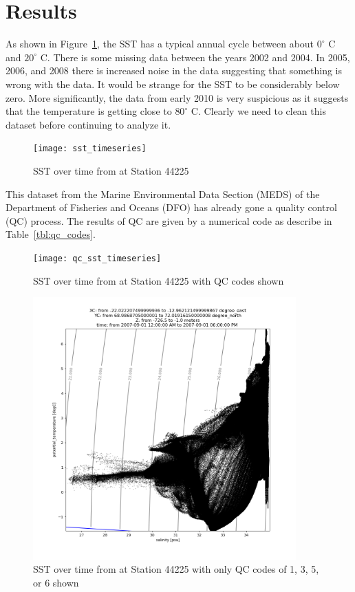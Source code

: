 \documentclass[12pt, letterpaper]{article}
\begin{document}
\section{Results}

As shown in Figure~\ref{fig:sst_timeseries}, the SST has a typical annual cycle between about $0^\circ$ C and $20^\circ$ C. There is some missing data between the years 2002 and 2004.  In 2005, 2006, and 2008 there is
increased noise in the data suggesting that something is wrong with the data.  It would be strange for the SST to be considerably below zero.  More significantly, the data from early 2010 is very suspicious as it suggests that the temperature is getting close to $80^\circ$ C.  Clearly we need to clean this dataset before continuing to analyze it.

\begin{figure}
\texttt{[image: sst\_timeseries]}
\caption{SST over time from at Station 44225}
\label{fig:sst_timeseries}
\end{figure}

This dataset from the Marine Environmental Data Section (MEDS) of the Department of Fisheries and Oceans (DFO) has already gone a quality control (QC) process. The results of QC are given by a numerical code as describe in Table~\ref{tbl:qc_codes}.



\begin{figure}
\texttt{[image: qc\_sst\_timeseries]}
\caption{SST over time from at Station 44225 with QC codes shown}
\label{fig:qc_sst_timeseries}
\end{figure}

\begin{figure}
\includegraphics[width=0.9\textwidth]{TempvsSalinity}
\caption{SST over time from at Station 44225 with only QC codes of 1, 3, 5, or 6 shown}
\label{fig:TempvsSalinity}
\end{figure}
\end{document}
